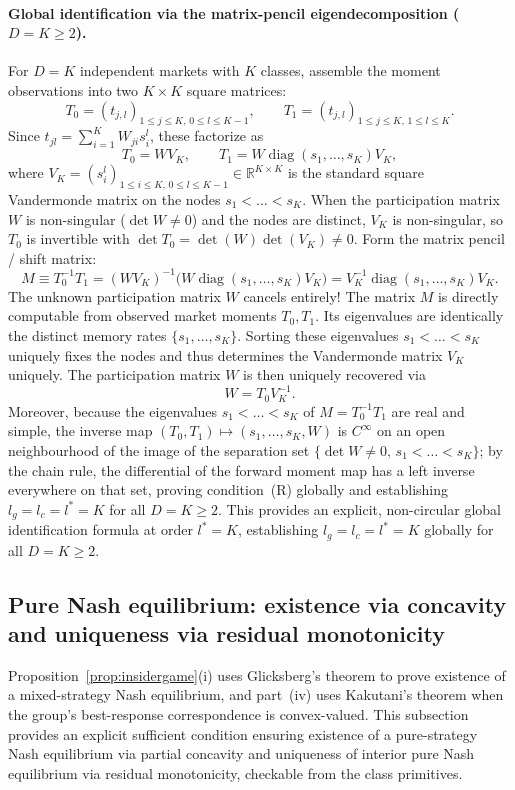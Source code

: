 \documentclass[12pt]{article}
\theoremstyle{definition}
\theoremstyle{remark}
\begin{document}
\paragraph{Global identification via the matrix-pencil eigendecomposition ($D=K\ge2$).} For $D=K$ independent markets with $K$ classes, assemble the moment observations into two $K\times K$ square matrices:
\[
T_0 = (t_{j,l})_{1\le j\le K,\,0\le l\le K-1},\qquad T_1 = (t_{j,l})_{1\le j\le K,\,1\le l\le K}.
\]
Since $t_{jl}=\sum_{i=1}^K W_{ji}s_i^l$, these factorize as
\[
T_0 = W V_K,\qquad T_1 = W \operatorname{diag}(s_1,\dots,s_K) V_K,
\]
where $V_K=(s_i^l)_{1\le i\le K,\,0\le l\le K-1}\in\mathbb{R}^{K\times K}$ is the standard square Vandermonde matrix on the nodes $s_1<\dots<s_K$. When the participation matrix $W$ is non-singular ($\det W\ne0$) and the nodes are distinct, $V_K$ is non-singular, so $T_0$ is invertible with $\det T_0 = \det(W)\det(V_K)\ne0$. Form the matrix pencil / shift matrix:
\[
M \equiv T_0^{-1}T_1 = (W V_K)^{-1}\bigl(W \operatorname{diag}(s_1,\dots,s_K) V_K\bigr) = V_K^{-1}\operatorname{diag}(s_1,\dots,s_K) V_K.
\]
The unknown participation matrix $W$ cancels entirely! The matrix $M$ is directly computable from observed market moments $T_0, T_1$. Its eigenvalues are identically the distinct memory rates $\{s_1,\dots,s_K\}$. Sorting these eigenvalues $s_1<\dots<s_K$ uniquely fixes the nodes and thus determines the Vandermonde matrix $V_K$ uniquely. The participation matrix $W$ is then uniquely recovered via
\[
W = T_0 V_K^{-1}.
\]
Moreover, because the eigenvalues $s_1 < \dots < s_K$ of $M = T_0^{-1}T_1$ are real and simple, the inverse map $(T_0, T_1) \mapsto (s_1,\dots,s_K, W)$ is $C^\infty$ on an open neighbourhood of the image of the separation set $\{\det W \ne 0,\, s_1 < \dots < s_K\}$; by the chain rule, the differential of the forward moment map has a left inverse everywhere on that set, proving condition~(R) globally and establishing $l_g = l_c = l^* = K$ for all $D = K \ge 2$.
This provides an explicit, non-circular global identification formula at order $l^*=K$, establishing $l_g=l_c=l^*=K$ globally for all $D=K\ge2$.

\subsection{Pure Nash equilibrium: existence via concavity and uniqueness via residual monotonicity}\label{app:nashtight}

Proposition~\ref{prop:insidergame}(i) uses Glicksberg's theorem to prove existence of a mixed-strategy Nash equilibrium, and part~(iv) uses Kakutani's theorem when the group's best-response correspondence is convex-valued. This subsection provides an explicit sufficient condition ensuring existence of a pure-strategy Nash equilibrium via partial concavity and uniqueness of interior pure Nash equilibrium via residual monotonicity, checkable from the class primitives.
\end{document}
